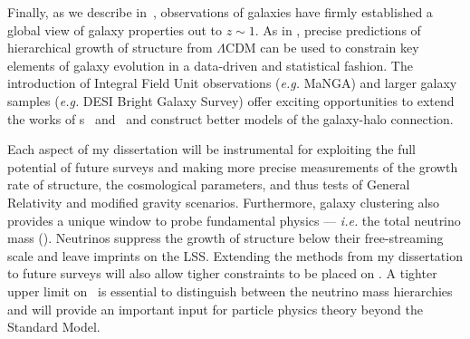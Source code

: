 
Finally, as we describe in~, observations of galaxies have 
firmly established a global view of galaxy properties out to $z{\sim}1$. 
As in , precise predictions of hierarchical growth of 
structure from $\Lambda$CDM can be used to constrain key elements of 
galaxy evolution in a data-driven and statistical fashion. The introduction 
of Integral Field Unit observations (\emph{e.g.} MaNGA) and larger 
galaxy samples (\emph{e.g.} DESI Bright Galaxy Survey) offer exciting 
opportunities to extend the works of \chapname s~ and~
and construct better models of the galaxy-halo connection.

Each aspect of my dissertation will be instrumental for exploiting the full 
potential of future surveys and making more precise measurements of the growth
rate of structure, the cosmological parameters, and thus tests of General Relativity 
and modified gravity scenarios. 
Furthermore, galaxy clustering also provides a unique window to probe 
fundamental physics --- {\em i.e.} the total neutrino mass (\mneut). Neutrinos 
suppress the growth of structure below their free-streaming scale and leave 
imprints on the LSS. Extending the methods from my dissertation to future 
surveys will also allow tigher constraints to be placed on \mneut. A tighter 
upper limit on \mneut ~is essential to distinguish between the neutrino mass 
hierarchies and will provide an important input for particle physics theory 
beyond the Standard Model.



